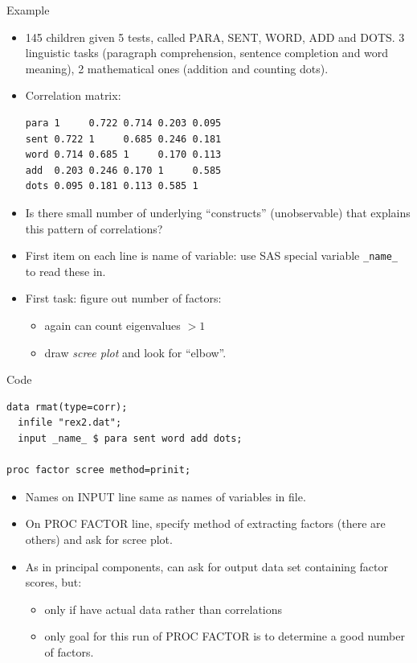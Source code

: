 \documentclass[pdf]{prosper}
\begin{document}
\begin{slide}{Example}

  \begin{itemize}
  \item 
145 children given 5 tests, called PARA, SENT, WORD, ADD and DOTS. 3 linguistic tasks (paragraph comprehension, sentence completion  and word meaning), 2 mathematical ones (addition and counting dots).
\item Correlation matrix:

\begin{verbatim}
para 1     0.722 0.714 0.203 0.095
sent 0.722 1     0.685 0.246 0.181
word 0.714 0.685 1     0.170 0.113
add  0.203 0.246 0.170 1     0.585
dots 0.095 0.181 0.113 0.585 1
\end{verbatim}

\item Is there small number of underlying ``constructs'' (unobservable) that explains this pattern of correlations?
\item First item on each line is name of variable: use SAS special variable \verb-_name_- to read these in.
\item First task: figure out number of factors:
  \begin{itemize}
  \item again can count eigenvalues $>1$
  \item draw {\em scree plot} and look for ``elbow''.
  \end{itemize}


  \end{itemize}
  
\end{slide}

\begin{slide}{Code}

\begin{verbatim}
data rmat(type=corr);
  infile "rex2.dat";
  input _name_ $ para sent word add dots;

proc factor scree method=prinit;

\end{verbatim}

  \begin{itemize}
  \item Names on INPUT line same as names of variables in file.
  \item On PROC FACTOR line, specify method of extracting factors (there are others) and ask for scree plot.
  \item As in principal components, can ask for output data set containing factor scores, but:
    \begin{itemize}
    \item only if have actual data rather than correlations
    \item only goal for this run of PROC FACTOR is to determine a good number of factors.
    \end{itemize}
  \end{itemize}
  
\end{slide}
\end{document}

